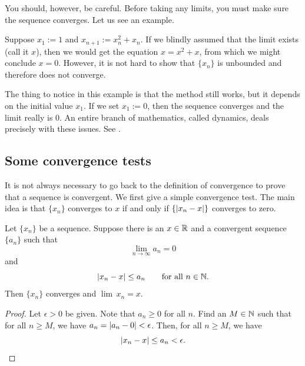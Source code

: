 You should, however, be careful.  Before taking any limits, you must
make sure the sequence converges.  Let us see an example.

\begin{example}
Suppose $x_1 := 1$ and $x_{n+1} := x_n^2+x_n$.
If we blindly assumed that the limit exists (call it $x$), then we
would get the equation $x = x^2+x$, from which we might
conclude $x=0$.  However, it is not hard
to show that $\{ x_n \}$ is unbounded and therefore does not converge.

The thing to notice in this example is that the method still works, but
it depends on the initial value $x_1$.  If we set $x_1 := 0$,
then the sequence converges and the limit really is 0.
An entire branch of mathematics, called dynamics, deals precisely with these
issues.
See
.
\end{example}

\subsection{Some convergence tests}

It is not always necessary to go back to the definition of convergence
to prove that a sequence is convergent.  We first give a simple convergence test.
The main idea is that 
$\{ x_n \}$ converges to $x$ if and only if 
$\{ \left\lvert { x_n - x } \right\rvert \}$ converges to zero.

\begin{prop} \label{convzero:prop}
Let $\{ x_n \}$ be a sequence. 
Suppose there is an $x \in {\mathbb{R}}$
and a convergent sequence $\{ a_n \}$
such that
\begin{equation*}
\lim_{n\to\infty} a_n = 0
\end{equation*}
and 
\begin{equation*}
\left\lvert {x_n - x} \right\rvert \leq a_n
\qquad
\text{for all $n \in {\mathbb{N}}$.}
\end{equation*}
Then $\{ x_n \}$ converges and $\lim\, x_n = x$.
\end{prop}

\begin{proof}
Let $\epsilon > 0$ be given.  Note that $a_n \geq 0$
for all $n$.  Find an $M \in {\mathbb{N}}$ such that for
all $n \geq M$, we have
$a_n = \left\lvert {a_n - 0} \right\rvert < \epsilon$.  Then, for all $n \geq M$,
we have
\begin{equation*}
\left\lvert {x_n - x} \right\rvert \leq a_n < \epsilon . \qedhere
\end{equation*}
\end{proof}


